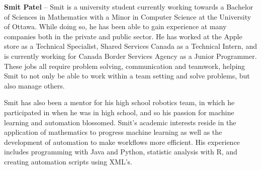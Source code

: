 \textbf{Smit Patel} – Smit is a university student currently working towards a Bachelor of Sciences in Mathematics with a Minor in Computer Science at the University of Ottawa. While doing so, he has been able to gain experience at many companies both in the private and public sector. He has worked at the Apple store as a Technical Specialist, Shared Services Canada as a Technical Intern, and is currently working for Canada Border Services Agency as a Junior Programmer. These jobs all require problem solving, communication and teamwork, helping Smit to not only be able to work within a team setting and solve problems, but also manage others. \par Smit has also been a mentor for his high school robotics team, in which he participated in when he was in high school, and so his passion for machine learning and automation blossomed. Smit’s academic interests reside in the application of mathematics to progress machine learning as well as the development of automation to make workflows more efficient. His experience includes programming with Java and Python, statistic analysis with R, and creating automation scripts using XML’s.